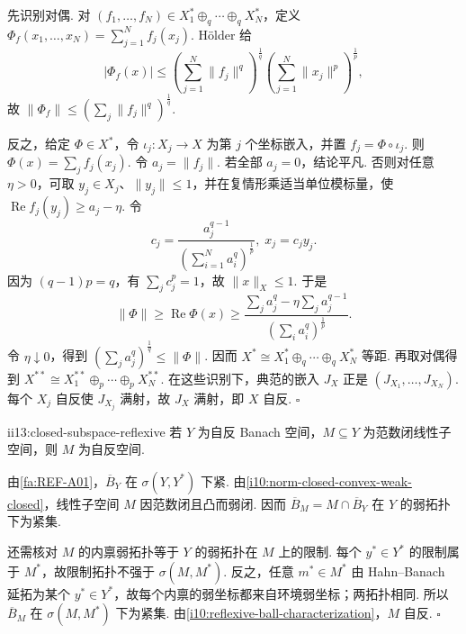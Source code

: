 \begin{FAProof}
先识别对偶. 对 \(\displaystyle(f_1,\dots,f_N)\in X_1^*\oplus_q\cdots\oplus_qX_N^*\)，定义 \(\displaystyle \Phi_f(x_1,\dots,x_N)=\sum_{j=1}^Nf_j(x_j)\). Hölder 给
\[
|\Phi_f(x)|
\leqslant
\left(\sum_{j=1}^N\|f_j\|^q\right)^{\frac{1}{q}}
\left(\sum_{j=1}^N\|x_j\|^p\right)^{\frac{1}{p}},
\]
故 \(\displaystyle\|\Phi_f\|\leqslant(\sum_j\|f_j\|^q)^{\frac{1}{q}}\).

反之，给定 \(\displaystyle\Phi\in X^*\)，令 \(\displaystyle\iota_j:X_j\to X\) 为第 \(\displaystyle j\) 个坐标嵌入，并置 \(\displaystyle f_j=\Phi\circ\iota_j\). 则 \(\displaystyle\Phi(x)=\sum_jf_j(x_j)\). 令 \(\displaystyle a_j=\|f_j\|\). 若全部 \(\displaystyle a_j=0\)，结论平凡. 否则对任意 \(\displaystyle\eta>0\)，可取 \(\displaystyle y_j\in X_j\)、\(\displaystyle\|y_j\|\leqslant1\)，并在复情形乘适当单位模标量，使 \(\displaystyle \operatorname{Re}f_j(y_j) \geqslant a_j-\eta.\)
令
\[
c_j
=
\frac{a_j^{q-1}}
{(\sum_{i=1}^Na_i^q)^{\frac{1}{p}}},
\;
x_j=c_jy_j.
\]
因为 \(\displaystyle(q-1)p=q\)，有 \(\displaystyle\sum_jc_j^p=1\)，故 \(\displaystyle\|x\|_X\leqslant1\). 于是
\[
\|\Phi\|
\geqslant
\operatorname{Re}\Phi(x)
\geqslant
\frac{\sum_ja_j^q-\eta\sum_ja_j^{q-1}}
{(\sum_ia_i^q)^{\frac{1}{p}}}.
\]
令 \(\displaystyle\eta\downarrow0\)，得到 \(\displaystyle(\sum_ja_j^q)^{\frac{1}{q}}\leqslant\|\Phi\|\). 因而 \(\displaystyle X^* \cong X_1^*\oplus_q\cdots\oplus_qX_N^*\)
等距. 再取对偶得到 \(\displaystyle X^{**} \cong X_1^{**}\oplus_p\cdots\oplus_pX_N^{**}.\)
在这些识别下，典范的嵌入 \(\displaystyle J_X\) 正是 \(\displaystyle(J_{X_1},\dots,J_{X_N})\). 每个 \(\displaystyle X_j\) 自反使 \(\displaystyle J_{X_j}\) 满射，故 \(\displaystyle J_X\) 满射，即 \(\displaystyle X\) 自反.
\hfill\(\square\)
\end{FAProof}

\begin{FALemma}[B][自反空间的闭线性子空间自反]{ii13:closed-subspace-reflexive}
若 \(\displaystyle Y\) 为自反 Banach 空间，\(\displaystyle M\subseteq Y\) 为范数闭线性子空间，则 \(\displaystyle M\) 为自反空间.
\end{FALemma}

\begin{FAProof}
由\autoref{fa:REF-A01}，\(\displaystyle\overline B_Y\) 在 \(\displaystyle\sigma(Y,Y^*)\) 下紧. 由\autoref{i10:norm-closed-convex-weak-closed}，线性子空间 \(\displaystyle M\) 因范数闭且凸而弱闭. 因而 \(\displaystyle \overline B_M = M\cap\overline B_Y\)
在 \(\displaystyle Y\) 的弱拓扑下为紧集.

还需核对 \(\displaystyle M\) 的内禀弱拓扑等于 \(\displaystyle Y\) 的弱拓扑在 \(\displaystyle M\) 上的限制. 每个 \(\displaystyle y^*\in Y^*\) 的限制属于 \(\displaystyle M^*\)，故限制拓扑不强于 \(\displaystyle\sigma(M,M^*)\). 反之，任意 \(\displaystyle m^*\in M^*\) 由 Hahn--Banach 延拓为某个 \(\displaystyle y^*\in Y^*\)，故每个内禀的弱坐标都来自环境弱坐标；两拓扑相同. 所以 \(\displaystyle\overline B_M\) 在 \(\displaystyle\sigma(M,M^*)\) 下为紧集. 由\autoref{i10:reflexive-ball-characterization}，\(\displaystyle M\) 自反.
\hfill\(\square\)
\end{FAProof}

